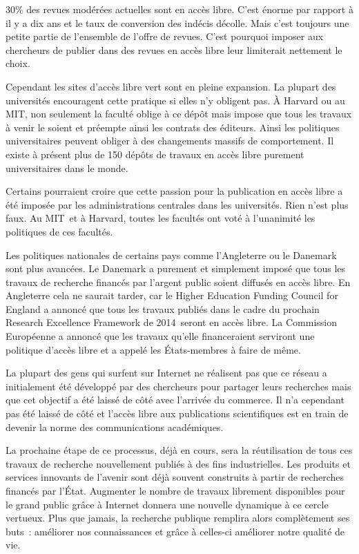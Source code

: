 30\% des revues modérées actuelles sont en accès libre. C'est énorme par rapport à il y a dix ans et le taux de conversion des indécis décolle. Mais c'est toujours une petite partie de l'ensemble de l'offre de revues. C'est pourquoi imposer aux chercheurs de publier dans des revues en accès libre leur limiterait nettement le choix.

Cependant les sites d'accès libre vert sont en pleine expansion. La plupart des universités encouragent cette pratique si elles n'y obligent pas. À Harvard ou au MIT, non seulement la faculté oblige à ce dépôt mais impose que tous les travaux à venir le soient et préempte ainsi les contrats des éditeurs. Ainsi les politiques universitaires peuvent obliger à des changements massifs de comportement. Il existe à présent plus de 150 dépôts de travaux en accès libre purement universitaires dans le monde. 

Certains pourraient croire que cette passion pour la publication en accès libre a été imposée par les administrations centrales dans les universités. Rien n'est plus faux. Au MIT et à Harvard, toutes les facultés ont voté à l'unanimité les politiques de ces facultés. 

Les politiques nationales de certains pays comme l'Angleterre ou le Danemark sont plus avancées. Le Danemark a purement et simplement imposé que tous les travaux de recherche financés par l'argent public soient diffusés en accès libre. En Angleterre cela ne saurait tarder, car le Higher Education Funding Council for England a annoncé que tous les travaux publiés dans le cadre du prochain Research Excellence Framework de 2014 seront en accès libre. La Commission Européenne a annoncé que les travaux qu'elle financeraient serviront une politique d'accès libre et a appelé les États-membres à faire de même.

La plupart des gens qui surfent sur Internet ne réalisent pas que ce réseau a initialement été développé par des chercheurs pour partager leurs recherches mais que cet objectif a été laissé de côté avec l'arrivée du commerce. Il n'a cependant pas été laissé de côté et l'accès libre aux publications scientifiques est en train de devenir la norme des communications académiques. 

La prochaine étape de ce processus, déjà en cours, sera la réutilisation de tous ces travaux de recherche nouvellement publiés à des fins industrielles. Les produits et services innovants de l'avenir sont déjà souvent construits à partir de recherches financés par l'État. Augmenter le nombre de travaux librement disponibles pour le grand public grâce à Internet donnera une nouvelle dynamique à ce cercle vertueux. Plus que jamais, la recherche publique remplira alors complètement ses buts~: améliorer nos connaissances et grâce à celles-ci améliorer notre qualité de vie.


